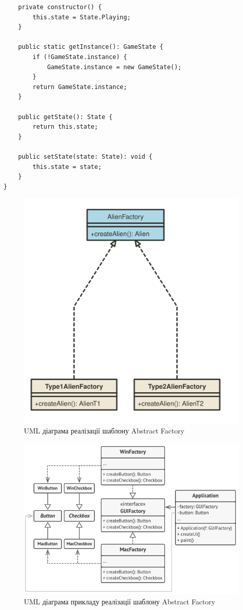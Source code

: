 \documentclass[oneside,14pt]{extarticle}
\begin{document}
\begin{normalsize}
\begin{small}
\begin{lstlisting}
	private constructor() {
		this.state = State.Playing;
	}
	
	public static getInstance(): GameState {
		if (!GameState.instance) {
			GameState.instance = new GameState();
		}
		return GameState.instance;
	}
	
	public getState(): State {
		return this.state;
	}
	
	public setState(state: State): void {
		this.state = state;
	}
}
		\end{lstlisting}
	\end{small}
	
	\begin{figure}[H]
		\centering
		\includegraphics[width=\textwidth]{abstract-factory}
		\caption{UML діаграма реалізації шаблону Abstract Factory}
	\end{figure}
	
		\begin{figure}[H]
		\centering
		\includegraphics[width=\textwidth]{abstract-factory-ex}
		\caption{UML діаграма прикладу реалізації шаблону Abstract Factory}
	\end{figure}
	

\end{normalsize}
\end{document}
